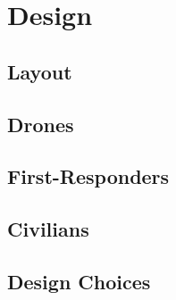 
\section{Design}

\subsection{Layout}

\subsection{Drones}

\subsection{First-Responders}

\subsection{Civilians}

\subsection{Design Choices}
